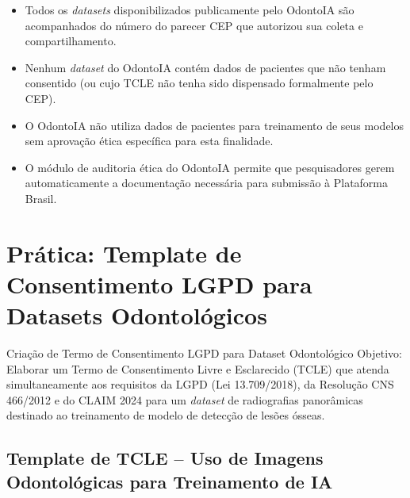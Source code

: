 \begin{itemize}
  \item Todos os \textit{datasets} disponibilizados publicamente pelo OdontoIA
    são acompanhados do número do parecer CEP que autorizou sua coleta e
    compartilhamento.
  \item Nenhum \textit{dataset} do OdontoIA contém dados de pacientes que não
    tenham consentido (ou cujo TCLE não tenha sido dispensado formalmente pelo
    CEP).
  \item O OdontoIA não utiliza dados de pacientes para treinamento de seus
    modelos sem aprovação ética específica para esta finalidade.
  \item O módulo de auditoria ética do OdontoIA permite que pesquisadores gerem
    automaticamente a documentação necessária para submissão à Plataforma Brasil.
\end{itemize}


\section{Prática: Template de Consentimento LGPD para Datasets Odontológicos}
\label{sec:pratica-lgpd}

\nivelcinco

\begin{pratica}{Criação de Termo de Consentimento LGPD para Dataset Odontológico}
  Objetivo: Elaborar um Termo de Consentimento Livre e Esclarecido (TCLE) que
  atenda simultaneamente aos requisitos da LGPD (Lei 13.709/2018), da Resolução
  CNS 466/2012 e do CLAIM 2024 para um \textit{dataset} de radiografias
  panorâmicas destinado ao treinamento de modelo de detecção de lesões ósseas.
\end{pratica}

\subsection{Template de TCLE -- Uso de Imagens Odontológicas para Treinamento de IA}

